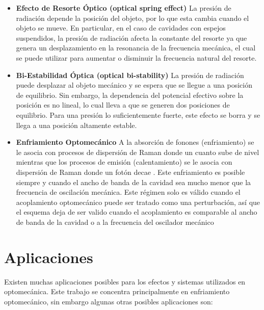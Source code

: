 \documentclass[10pt,a4paper]{report}
\begin{document}
\begin{itemize}
\item \textbf{Efecto de Resorte Óptico (optical spring effect)} La
  presión de radiación depende  la posición del objeto, por lo que esta
  cambia cuando el objeto se mueve. En particular, en el caso de
  cavidades con espejos suspendidos, la presión de radiación afecta la
  constante del resorte ya que genera un desplazamiento en la
  resonancia de la frecuencia mecánica, el cual se puede utilizar para
  aumentar o disminuir la frecuencia natural del
  resorte.\cite{BraginskyPE}

\item \textbf{Bi-Estabilidad Óptica (optical bi-stability)} La presión
  de radiación puede desplazar al objeto mecánico y se espera que se
  llegue a una posición de equilibrio. Sin embargo, la dependencia del
  potencial efectivo sobre la posición es no lineal, lo cual lleva a
  que se generen dos posiciones de equilibrio. Para una presión lo
  suficientemente fuerte, este efecto se borra y se llega a una
  posición altamente estable\cite{DorselOB}.

\item \textbf{Enfriamiento Optomecánico}  A la absorción de
  fonones (enfriamiento) se le asocia con procesos de dispersión de
  Raman donde un cuanto sube de nivel mientras que los procesos de
  emisión (calentamiento) se le asocia con dispersión de Raman donde
  un fotón decae \cite{LCNooshi}. Este enfriamiento es posible siempre
  y cuando el ancho de banda de la cavidad sea mucho menor que la
  frecuencia de oscilación mecánica. \cite{LCNooshi}
  \cite{MarquardtSC} Este régimen solo es válido cuando el
  acoplamiento optomecánico puede ser tratado como una perturbación,
  así que el esquema deja de ser valido cuando el acoplamiento es
  comparable al ancho de banda de la cavidad o a la frecuencia del
  oscilador mecánico
\end{itemize}


\section{Aplicaciones}

Existen muchas aplicaciones posibles para los efectos y sistemas utilizados en optomecánica. Este trabajo se concentra principalmente en enfriamiento optomecánico, sin embargo algunas otras posibles aplicaciones son:
\end{document}
